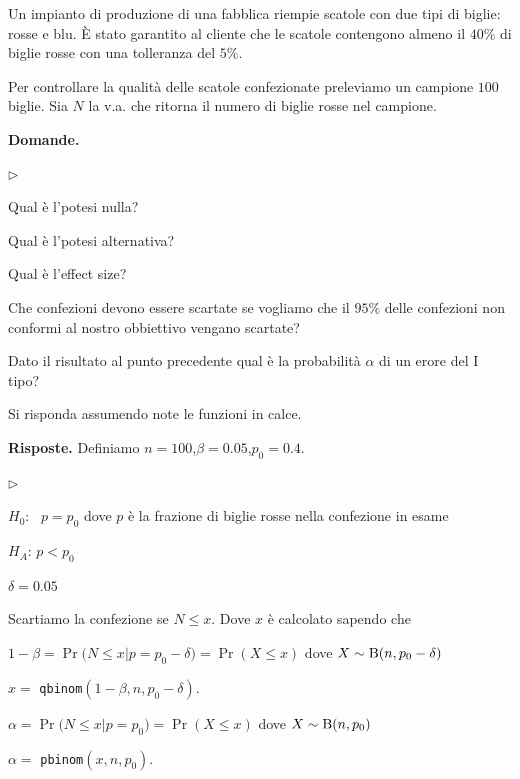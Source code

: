 \documentclass[11pt,openany]{book}
\newcommand{\mylabel}[1]{{\footnotesize\textsf{#1}}\hfill}
\renewenvironment{itemize}
  {\begin{list}{$\triangleright$}{%
   \setlength{\parskip}{0mm}
   \setlength{\topsep}{.2\baselineskip}
   \setlength{\rightmargin}{0mm}
   \setlength{\listparindent}{0mm}
   \setlength{\itemindent}{0mm}
   \setlength{\labelwidth}{3ex}
   \setlength{\itemsep}{.4\baselineskip}
   \setlength{\parsep}{0mm}
   \setlength{\partopsep}{0mm}
   \setlength{\labelsep}{1ex}
   \setlength{\leftmargin}{\labelwidth+\labelsep}
   \let\makelabel\mylabel}}{%
   \end{list}\vspace*{-1.3mm}}
\begin{document}
Un impianto di produzione di una fabblica riempie scatole con due tipi di biglie: rosse e blu.
È stato garantito al cliente che le scatole contengono almeno il $40\%$ di biglie rosse con una tolleranza del $5\%$.

Per controllare la qualità delle scatole confezionate preleviamo un campione $100$ biglie. Sia $N$ la v.a. che ritorna il numero di biglie rosse nel campione.


\textbf{Domande.}

\begin{itemize}
\item[1.] Qual è l'potesi nulla?

\item[2.] Qual è l'potesi alternativa?

\item[3.] Qual è l'effect size?

\item[4.] Che confezioni devono essere scartate se vogliamo che il  $95\%$ delle confezioni non conformi al nostro obbiettivo vengano scartate?

\item[5.] Dato il risultato al punto precedente qual è la probabilità $\alpha$ di un erore del I tipo? 
\end{itemize}

Si risponda assumendo note le funzioni in calce.


\textbf{Risposte.} Definiamo $n=100$,\quad $\beta=0.05$,\quad $p_0=0.4$.

\begin{itemize}
\item[1.] $H_0$: \ $p=p_0$ dove $p$ è la frazione di biglie rosse nella confezione in esame

\item[2.] $H_A$: $p< p_0$ 

\item[3.] $\delta=0.05$

\item[4.] Scartiamo la confezione se $N\le x$. 
Dove $x$ è calcolato sapendo che\smallskip

$1-\beta=\Pr\big(N\le x \mathbin\big| p=p_0-\delta\big)=\Pr(X\le x)$ dove $X\sim{\rm B}(n,p_0-\delta)$\smallskip

\hfill
$x =$ {\tt qbinom}$(1-\beta,n,p_0-\delta).$

\item[5.] $\alpha=\Pr\big(N\le x \mathbin\big| p=p_0\big)=\Pr(X\le x)$  dove $X\sim{\rm B}(n,p_0)$\smallskip

\hfill
$\alpha =$ {\tt pbinom}$(x,n,p_0)$.
\end{itemize}
\end{document}
